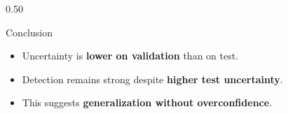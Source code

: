 \documentclass[aspectratio=169]{beamer}
\begin{document}
\begin{frame}
\begin{columns}[T,onlytextwidth]
        \begin{column}{0.50\textwidth}
            \begin{exampleblock}{Conclusion}
                \scriptsize
                \begin{itemize}
                    \setlength{\itemsep}{0.1em}
                    \item Uncertainty is
                    \textbf{lower on validation}
                    than on test.
                    \item Detection remains strong despite
                    \textbf{higher test uncertainty}.
                    \item This suggests
                    \textbf{generalization without overconfidence}.
                \end{itemize}
            \end{exampleblock}
        \end{column}
    \end{columns}

\end{frame}
\end{document}
